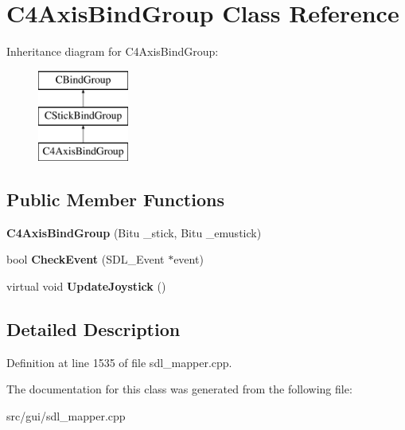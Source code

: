 \hypertarget{classC4AxisBindGroup}{\section{C4\-Axis\-Bind\-Group Class Reference}
\label{classC4AxisBindGroup}
}
Inheritance diagram for C4\-Axis\-Bind\-Group\-:\begin{figure}[H]
\begin{center}
\leavevmode
\includegraphics[height=3.000000cm]{classC4AxisBindGroup}
\end{center}
\end{figure}
\subsection*{Public Member Functions}
\begin{DoxyCompactItemize}
\item 
\hypertarget{classC4AxisBindGroup_a18f535cb78f267a882176039fa912394}{{\bfseries C4\-Axis\-Bind\-Group} (Bitu \-\_\-stick, Bitu \-\_\-emustick)}\label{classC4AxisBindGroup_a18f535cb78f267a882176039fa912394}

\item 
\hypertarget{classC4AxisBindGroup_a895bb30dd9adc0b2a704e30d954b7f5e}{bool {\bfseries Check\-Event} (S\-D\-L\-\_\-\-Event $\ast$event)}\label{classC4AxisBindGroup_a895bb30dd9adc0b2a704e30d954b7f5e}

\item 
\hypertarget{classC4AxisBindGroup_a2de71ed1c0b11f15403f1a63ea7f9169}{virtual void {\bfseries Update\-Joystick} ()}\label{classC4AxisBindGroup_a2de71ed1c0b11f15403f1a63ea7f9169}

\end{DoxyCompactItemize}


\subsection{Detailed Description}


Definition at line 1535 of file sdl\-\_\-mapper.\-cpp.



The documentation for this class was generated from the following file\-:\begin{DoxyCompactItemize}
\item 
src/gui/sdl\-\_\-mapper.\-cpp\end{DoxyCompactItemize}
